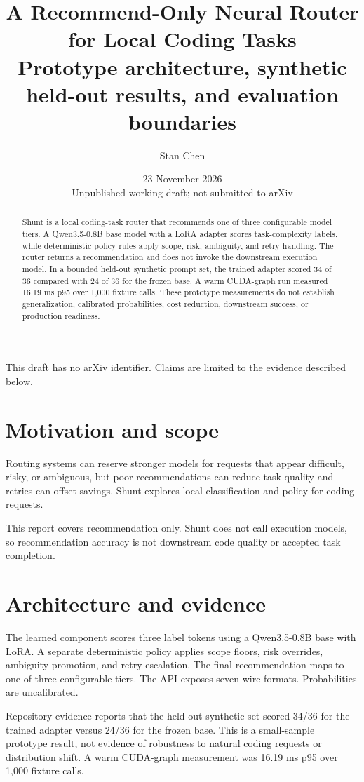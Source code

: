 \documentclass[11pt]{article}
\title{A Recommend-Only Neural Router for Local Coding Tasks\\\large Prototype architecture, synthetic held-out results, and evaluation boundaries}
\author{Stan Chen}
\date{23 November 2026\\[4pt]\small Unpublished working draft; not submitted to arXiv}
\begin{document}
\maketitle
\begin{center}\small This draft has no arXiv identifier. Claims are limited to the evidence described below.\end{center}
\begin{abstract}
Shunt is a local coding-task router that recommends one of three configurable model tiers. A Qwen3.5-0.8B base model with a LoRA adapter scores task-complexity labels, while deterministic policy rules apply scope, risk, ambiguity, and retry handling. The router returns a recommendation and does not invoke the downstream execution model. In a bounded held-out synthetic prompt set, the trained adapter scored 34 of 36 compared with 24 of 36 for the frozen base. A warm CUDA-graph run measured 16.19 ms p95 over 1,000 fixture calls. These prototype measurements do not establish generalization, calibrated probabilities, cost reduction, downstream success, or production readiness.
\end{abstract}
\section{Motivation and scope}
Routing systems can reserve stronger models \cite{r1} for requests that appear difficult, risky, or ambiguous, but poor recommendations can reduce task quality and retries can offset savings. Shunt explores local classification and policy for coding requests.\par
This report covers recommendation only. Shunt does not call execution models, so recommendation accuracy is not downstream code quality or accepted task completion.\par
\section{Architecture and evidence}
The learned component scores three label tokens using a Qwen3.5-0.8B base with LoRA. A separate deterministic policy applies scope floors, risk overrides, ambiguity promotion, and retry escalation. The final recommendation maps to one of three configurable tiers. The API exposes seven wire formats. Probabilities are uncalibrated.\par
Repository evidence \cite{r2} reports that the held-out synthetic set scored 34/36 for the trained adapter versus 24/36 for the frozen base. This is a small-sample prototype result, not evidence of robustness to natural coding requests or distribution shift. A warm CUDA-graph measurement was 16.19 ms p95 over 1,000 fixture calls.\par
\end{document}
